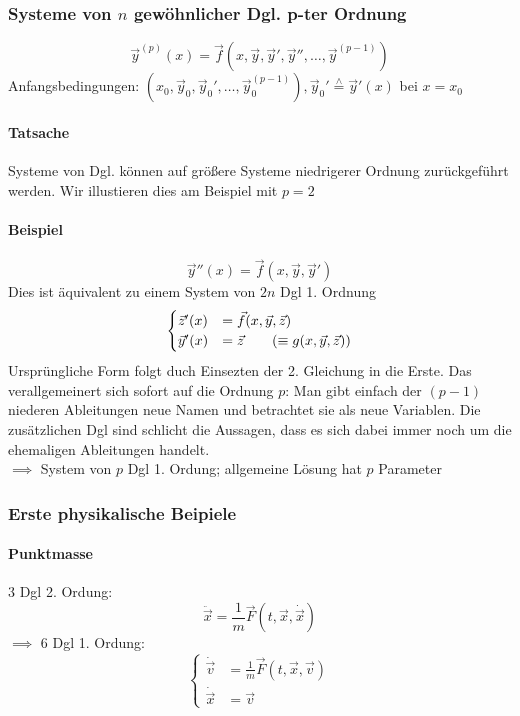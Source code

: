 \documentclass[a4paper]{scrartcl}
\newcommand{\estimates}{\overset{\scriptscriptstyle\wedge}{=}}
\newcommand{\f}[2]{\frac{#1}{#2}}
\renewcommand{\v}[1]{\vec{#1}}
\theoremstyle{definition}
\theoremstyle{plain}
\theoremstyle{remark}
\theoremstyle{remark}
\begin{document}
\subsubsection{Systeme von $n$ gewöhnlicher Dgl. p-ter Ordnung}
\label{sec-3-3-8}
\[\v{y}^{(p)}(x) = \v f(x,\v y,\v{y}',\v{y}'',\ldots,\v{y}^{(p-1)})\]
Anfangsbedingungen: $(x_0,\v{y}_0,\v{y}_0',\ldots,\v{y}_0^{(p - 1)}),\v{y}_0' \estimates \v{y}'(x)$ bei $x = x_0$ \\
\paragraph{Tatsache}
\label{sec-3-3-8-1}
Systeme von Dgl. können auf größere Systeme niedrigerer Ordnung zurückgeführt werden.
Wir illustieren dies am Beispiel mit $p = 2$
\paragraph{Beispiel}
\label{sec-3-3-8-2}
\[\v{y}''(x) = \v{f}(x,\v{y},\v{y}')\]
Dies ist äquivalent zu einem System von $2n$ Dgl 1. Ordnung
\begin{equation}
\begin{cases}
\v{z}'(x) &= \v{f}(x,\v{y},\v{z}) \\
\v{y}'(x) &= \v z \tag{$\equiv g(x,\v y, \v z)$}
\end{cases}
\end{equation}
Ursprüngliche Form folgt duch Einsezten der 2. Gleichung in die Erste.
Das verallgemeinert sich sofort auf die Ordnung $p$: Man gibt einfach der $(p - 1)$ niederen Ableitungen neue Namen und betrachtet sie als neue Variablen. Die zusätzlichen Dgl sind schlicht die Aussagen, dass es sich dabei immer noch um die ehemaligen Ableitungen handelt. \\
     $\implies$ System von $p$ Dgl 1. Ordung; allgemeine Lösung hat $p$ Parameter
\subsubsection{Erste physikalische Beipiele}
\label{sec-3-3-9}
\paragraph{Punktmasse}
\label{sec-3-3-9-1}
3 Dgl 2. Ordung: \[\ddot{\v x} = \f{1}{m}\v F(t,\v x,\dot{\v x})\]
$\implies$ 6 Dgl 1. Ordung:
\begin{equation}
\begin{cases}
\dot{\v v} &= \f{1}{m}\v F(t,\v x,\v v) \\
\dot{\v x} &= \v v
\end{cases}
\end{equation}
\end{document}
